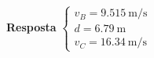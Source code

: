 
\textbf{Resposta}
$
\begin{cases}
	v_{B}=\SI{9.515}{\meter/\second}\\
	d=\SI{6.79}{\meter}\\
	v_{C}=\SI{16.34}{\meter/\second}
\end{cases}
$